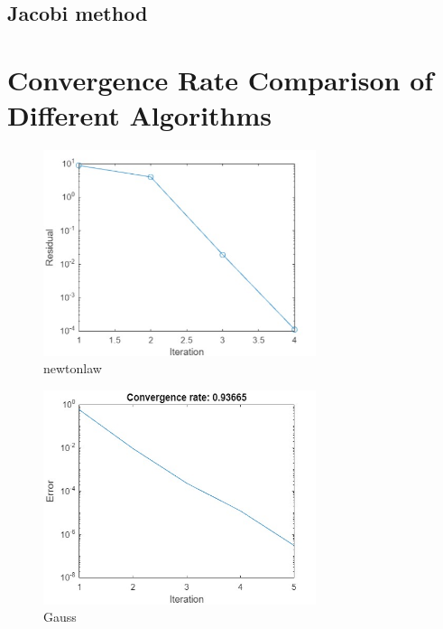 \documentclass[12pt, a4paper, oneside]{ctexart}
\begin{document}
\begin{spacing}{2.0}
\begin{lstlisting}[caption=Gauss-Seidel method with Convergence speed for iterative methods]
\end{lstlisting}
\subsection{Jacobi method}
\section{Convergence Rate Comparison of Different Algorithms}
\begin{figure}[H]
	\centering
	\includegraphics[width=8cm]{newtonlaw.jpg}
	\caption{newtonlaw}
\end{figure}
\begin{figure}[H]
	\centering
	\includegraphics[width=8cm]{Gauss.jpg}
	\caption{Gauss}
\end{figure}

\end{spacing}{}



\end{document}
